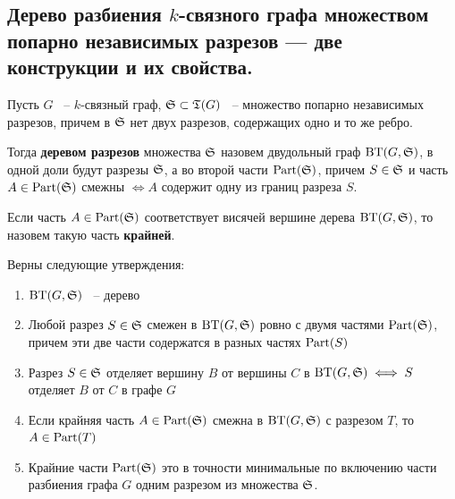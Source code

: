 \documentclass[../main.tex]{subfiles}
\begin{document}
\subsection{Дерево разбиения $k$-связного графа множеством попарно независимых разрезов — две конструкции и их свойства.}

\begin{df*}
	Пусть $G$ ~--  $k$-связный граф, $\S \subset \T(G)$ ~-- множество попарно независимых разрезов, причем в $\S$ нет двух разрезов, содержащих одно и то же ребро.

	Тогда \textbf{деревом разрезов} множества $\S$ назовем двудольный граф $\BT(G, \S)$, в одной доли будут разрезы  $\S$, а во второй части  $\Part(\S)$, причем $S \in \S$ и часть  $A \in \Part(\S)$ смежны $\iff A$ содержит одну из границ разреза $S$. 
\end{df*}

\begin{df*}
	Если часть $A \in \Part(\S)$ соответствует висячей вершине дерева  $\BT(G, \S)$, то назовем такую часть \textbf{крайней}.
\end{df*}

\begin{customthm}{1.2} \label{theorem:1_2}
	Верны следующие утверждения:

	\begin{enumerate}
		\item $\BT(G, \S)$ ~-- дерево 
		\item Любой разрез  $S \in \S$ смежен в  $\BT(G, \S)$ ровно с двумя частями  $\Part(\S)$, причем эти две части содержатся в разных частях  $\Part(S)$
		\item Разрез  $S \in \S$ отделяет вершину  $B$ от вершины  $C$ в  $\BT(G, \S) \iff S$ отделяет  $B$ от  $C$ в графе  $G$
		\item Если крайняя часть  $A \in \Part(\S)$ смежна в  $\BT(G, \S)$ с разрезом  $T$, то  $A \in \Part(T)$
		\item Крайние части  $\Part(\S)$ это в точности минимальные по включению части разбиения графа  $G$ одним разрезом из множества  $\S$.
	\end{enumerate}

\end{customthm}
\end{document}
